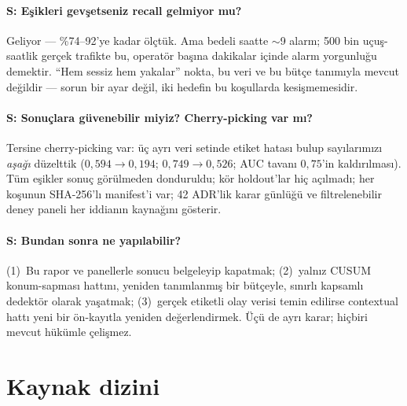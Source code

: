\documentclass[11pt,a4paper]{article}
\begin{document}
\paragraph{S: Eşikleri gevşetseniz recall gelmiyor mu?}
Geliyor --- \%74--92'ye kadar ölçtük. Ama bedeli saatte $\sim$9 alarm; 500 bin
uçuş-saatlik gerçek trafikte bu, operatör başına dakikalar içinde alarm yorgunluğu
demektir. ``Hem sessiz hem yakalar'' nokta, bu veri ve bu bütçe tanımıyla mevcut
değildir --- sorun bir ayar değil, iki hedefin bu koşullarda kesişmemesidir.

\paragraph{S: Sonuçlara güvenebilir miyiz? Cherry-picking var mı?}
Tersine cherry-picking var: üç ayrı veri setinde etiket hatası bulup sayılarımızı
\emph{aşağı} düzelttik ($0{,}594 \to 0{,}194$; $0{,}749 \to 0{,}526$; AUC tavanı
$0{,}75$'in kaldırılması). Tüm eşikler sonuç görülmeden donduruldu; kör
holdout'lar hiç açılmadı; her koşunun SHA-256'lı manifest'i var; 42 ADR'lik karar
günlüğü ve filtrelenebilir deney paneli her iddianın kaynağını gösterir.

\paragraph{S: Bundan sonra ne yapılabilir?}
(1)~Bu rapor ve panellerle sonucu belgeleyip kapatmak; (2)~yalnız CUSUM
konum-sapması hattını, yeniden tanımlanmış bir bütçeyle, sınırlı kapsamlı dedektör
olarak yaşatmak; (3)~gerçek etiketli olay verisi temin edilirse contextual hattı
yeni bir ön-kayıtla yeniden değerlendirmek. Üçü de ayrı karar; hiçbiri mevcut
hükümle çelişmez.

\section{Kaynak dizini}
\end{document}
